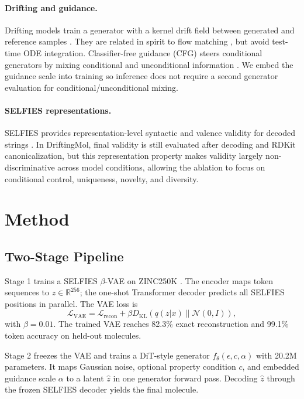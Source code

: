 \documentclass[letterpaper]{article}
\begin{document}
\paragraph{Drifting and guidance.}
Drifting models train a generator with a kernel drift field between generated
and reference samples \cite{deng2026drifting}. They are related in spirit to
flow matching \cite{lipman2023flow}, but avoid test-time ODE integration.
Classifier-free guidance (CFG) steers conditional generators by mixing
conditional and unconditional information \cite{ho2022classifierfree}. We embed the
guidance scale into training so inference does not require a second generator
evaluation for conditional/unconditional mixing.

\paragraph{SELFIES representations.}
SELFIES provides representation-level syntactic and valence validity for
decoded strings \cite{krenn2020selfies}. In DriftingMol, final validity is
still evaluated after decoding and RDKit canonicalization, but this
representation property makes validity largely non-discriminative across model
conditions, allowing the ablation to focus on conditional control, uniqueness,
novelty, and diversity.

\section{Method}

\subsection{Two-Stage Pipeline}

Stage 1 trains a SELFIES $\beta$-VAE on ZINC250K \cite{irwin2012zinc}. The
encoder maps token sequences to $z \in \mathbb{R}^{256}$; the one-shot
Transformer decoder predicts all SELFIES positions in parallel. The VAE loss is
\begin{equation}
    \mathcal{L}_{\mathrm{VAE}} =
    \mathcal{L}_{\mathrm{recon}} +
    \beta D_{\mathrm{KL}}(q(z|x)\|\mathcal{N}(0,I)),
\end{equation}
with $\beta=0.01$. The trained VAE reaches 82.3\% exact reconstruction and
99.1\% token accuracy on held-out molecules.

Stage 2 freezes the VAE and trains a DiT-style generator
\cite{peebles2023scalable}
$f_\theta(\epsilon,c,\alpha)$ with 20.2M parameters. It maps Gaussian noise,
optional property condition $c$, and embedded guidance scale $\alpha$ to a
latent $\hat{z}$ in one generator forward pass. Decoding $\hat{z}$ through the
frozen SELFIES decoder yields the final molecule.
\end{document}
